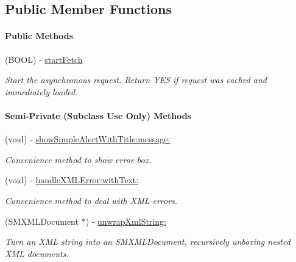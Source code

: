 \subsection*{Public Member Functions}
\begin{Indent}\paragraph*{Public Methods}
\begin{DoxyCompactItemize}
\item 
\hypertarget{interface_p_c_soap_fetcher_a0470e1598d9889537a3f89c96a6c4d45}{
(BOOL) -\/ \hyperlink{interface_p_c_soap_fetcher_a0470e1598d9889537a3f89c96a6c4d45}{startFetch}}
\label{interface_p_c_soap_fetcher_a0470e1598d9889537a3f89c96a6c4d45}

\begin{DoxyCompactList}\small\item\em Start the asynchronous request. Return YES if request was cached and immediately loaded. \end{DoxyCompactList}\end{DoxyCompactItemize}
\end{Indent}
\begin{Indent}\paragraph*{Semi-\/Private (Subclass Use Only) Methods}
\begin{DoxyCompactItemize}
\item 
\hypertarget{interface_p_c_soap_fetcher_afe80446bbea7157ffe85b089927f9dee}{
(void) -\/ \hyperlink{interface_p_c_soap_fetcher_afe80446bbea7157ffe85b089927f9dee}{showSimpleAlertWithTitle:message:}}
\label{interface_p_c_soap_fetcher_afe80446bbea7157ffe85b089927f9dee}

\begin{DoxyCompactList}\small\item\em Convenience method to show error box. \end{DoxyCompactList}\item 
\hypertarget{interface_p_c_soap_fetcher_a4e27193d32c4db97e2d19d17e3b091bf}{
(void) -\/ \hyperlink{interface_p_c_soap_fetcher_a4e27193d32c4db97e2d19d17e3b091bf}{handleXMLError:withText:}}
\label{interface_p_c_soap_fetcher_a4e27193d32c4db97e2d19d17e3b091bf}

\begin{DoxyCompactList}\small\item\em Convenience method to deal with XML errors. \end{DoxyCompactList}\item 
(SMXMLDocument $\ast$) -\/ \hyperlink{interface_p_c_soap_fetcher_a9ca44436c71d3702719bb13bdf163d83}{unwrapXmlString:}
\begin{DoxyCompactList}\small\item\em Turn an XML string into an SMXMLDocument, recursively unboxing nested XML documents. \end{DoxyCompactList}\end{DoxyCompactItemize}
\end{Indent}
